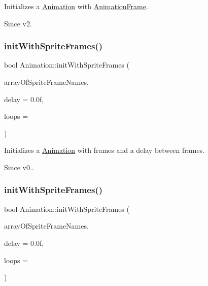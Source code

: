 Initializes a \hyperlink{classAnimation}{Animation} with \hyperlink{classAnimationFrame}{Animation\+Frame}. \begin{DoxySince}{Since}
v2. 
\end{DoxySince}
\mbox{\label{classAnimation_acd22ef6cbb5df1808adbde4b834ec198}} 
\subsubsection{\texorpdfstring{init\+With\+Sprite\+Frames()}{initWithSpriteFrames()}\hspace{0.1cm}{\footnotesize\ttfamily [1/2]}}
{\footnotesize\ttfamily bool Animation\+::init\+With\+Sprite\+Frames (\begin{DoxyParamCaption}\item[{const \hyperlink{classVector}{Vector}$<$ \hyperlink{classSpriteFrame}{Sprite\+Frame} $\ast$$>$ \&}]{array\+Of\+Sprite\+Frame\+Names,  }\item[{float}]{delay = {\ttfamily 0.0f},  }\item[{unsigned int}]{loops = {} }\end{DoxyParamCaption})}

Initializes a \hyperlink{classAnimation}{Animation} with frames and a delay between frames. \begin{DoxySince}{Since}
v0.. 
\end{DoxySince}
\mbox{\label{classAnimation_acd22ef6cbb5df1808adbde4b834ec198}} 
\subsubsection{\texorpdfstring{init\+With\+Sprite\+Frames()}{initWithSpriteFrames()}\hspace{0.1cm}{\footnotesize\ttfamily [2/2]}}
{\footnotesize\ttfamily bool Animation\+::init\+With\+Sprite\+Frames (\begin{DoxyParamCaption}\item[{const \hyperlink{classVector}{Vector}$<$ \hyperlink{classSpriteFrame}{Sprite\+Frame} $\ast$$>$ \&}]{array\+Of\+Sprite\+Frame\+Names,  }\item[{float}]{delay = {\ttfamily 0.0f},  }\item[{unsigned int}]{loops = {} }\end{DoxyParamCaption})}

